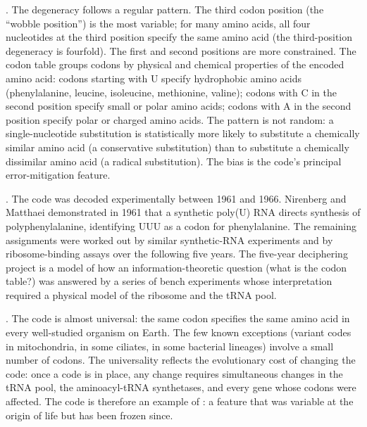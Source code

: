 . The degeneracy follows a regular pattern.
The third codon position (the ``wobble position'') is the most
variable; for many amino acids, all four nucleotides at the third
position specify the same amino acid (the third-position degeneracy
is fourfold). The first and second positions are more constrained.
The codon table groups codons by physical and chemical properties of
the encoded amino acid: codons starting with U specify hydrophobic
amino acids (phenylalanine, leucine, isoleucine, methionine, valine);
codons with C in the second position specify small or polar amino
acids; codons with A in the second position specify polar or charged
amino acids. The pattern is not random: a single-nucleotide
substitution is statistically more likely to substitute a chemically
similar amino acid (a conservative substitution) than to substitute a
chemically dissimilar amino acid (a radical substitution). The bias is
the code's principal error-mitigation feature.

. The code was decoded experimentally
between 1961 and 1966. Nirenberg and Matthaei \cite{paper:v6c03-nirenberg-matthaei-1961}
demonstrated in 1961 that a synthetic poly(U) RNA directs synthesis of
polyphenylalanine, identifying UUU as a codon for phenylalanine. The
remaining assignments were worked out by similar synthetic-RNA
experiments and by ribosome-binding assays over the following five
years. The five-year deciphering project is a model of how an
information-theoretic question (what is the codon table?) was answered
by a series of bench experiments whose interpretation required a
physical model of the ribosome and the tRNA pool.

. The code is almost universal: the same codon
specifies the same amino acid in every well-studied organism on Earth.
The few known exceptions (variant codes in mitochondria, in some
ciliates, in some bacterial lineages) involve a small number of
codons. The universality reflects the evolutionary cost of changing
the code: once a code is in place, any change requires simultaneous
changes in the tRNA pool, the aminoacyl-tRNA synthetases, and every
gene whose codons were affected. The code is therefore an example of
: a feature that was variable at the origin
of life but has been frozen since.

